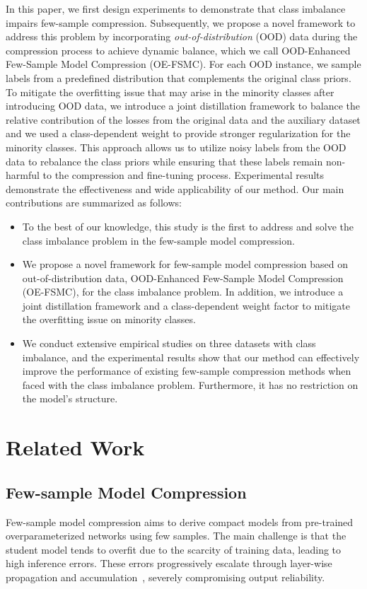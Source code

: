 \documentclass[twoside,11pt]{article}
\begin{document}
In this paper, we first design experiments to demonstrate that class imbalance impairs few-sample compression. Subsequently, we propose a novel framework to address this problem by incorporating \emph{out-of-distribution} (OOD) data during the compression process to achieve dynamic balance, which we call OOD-Enhanced Few-Sample Model Compression (OE-FSMC). For each OOD instance, we sample labels from a predefined distribution that complements the original class priors. To mitigate the overfitting issue that may arise in the minority classes after introducing OOD data, we introduce a joint distillation framework to balance the relative contribution of the losses from the original data and the auxiliary dataset and we used a class-dependent weight to provide stronger regularization for the minority classes. This approach allows us to utilize noisy labels from the OOD data to rebalance the class priors while ensuring that these labels remain non-harmful to the compression and fine-tuning process. Experimental results demonstrate the effectiveness and wide applicability of our method. Our main contributions are summarized as follows: 
\begin{itemize}
\item To the best of our knowledge, this study is the first to address and solve the class imbalance problem in the few-sample model compression. 
\item We propose a novel framework for few-sample model compression based on out-of-distribution data, OOD-Enhanced Few-Sample Model Compression (OE-FSMC), for the class imbalance problem. In addition, we introduce a joint distillation framework and a class-dependent weight factor to mitigate the overfitting issue on minority classes.
\item We conduct extensive empirical studies on three datasets with class imbalance, and the experimental results show that our method can effectively improve the performance of existing few-sample compression methods when faced with the class imbalance problem. Furthermore, it has no restriction on the model's structure.
\end{itemize}

\section{Related Work}
\subsection{Few-sample Model Compression}
Few-sample model compression aims to derive compact models from pre-trained overparameterized networks using few samples. The main challenge is that the student model tends to overfit due to the scarcity of training data, leading to high inference errors. These errors progressively escalate through layer-wise propagation and accumulation~\citep{dong2017learning}, severely compromising output reliability.
\end{document}
